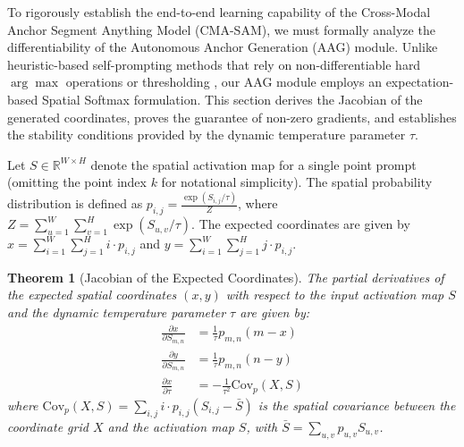 \documentclass[onecolumn]{IEEEtran}
\numberwithin{equation}{section}
\newtheorem{theorem}{Theorem}[section]
\theoremstyle{definition}
\theoremstyle{remark}
\begin{document}
To rigorously establish the end-to-end learning capability of the Cross-Modal Anchor Segment Anything Model (CMA-SAM), we must formally analyze the differentiability of the Autonomous Anchor Generation (AAG) module. Unlike heuristic-based self-prompting methods that rely on non-differentiable hard \(\arg\max\) operations or thresholding \cite{xie2025self, chen2024un}, our AAG module employs an expectation-based Spatial Softmax formulation. This section derives the Jacobian of the generated coordinates, proves the guarantee of non-zero gradients, and establishes the stability conditions provided by the dynamic temperature parameter \(\tau\).

Let \(S \in \mathbb{R}^{W \times H}\) denote the spatial activation map for a single point prompt (omitting the point index \(k\) for notational simplicity). The spatial probability distribution is defined as \(p_{i,j} = \frac{\exp(S_{i,j}/\tau)}{Z}\), where \(Z = \sum_{u=1}^W \sum_{v=1}^H \exp(S_{u,v}/\tau)\). The expected coordinates are given by \(x = \sum_{i=1}^W \sum_{j=1}^H i \cdot p_{i,j}\) and \(y = \sum_{i=1}^W \sum_{j=1}^H j \cdot p_{i,j}\).

\begin{theorem}[Jacobian of the Expected Coordinates]
\label{thm:jacobian_spatial_softmax}
The partial derivatives of the expected spatial coordinates \((x, y)\) with respect to the input activation map \(S\) and the dynamic temperature parameter \(\tau\) are given by:
\begin{align}
    \frac{\partial x}{\partial S_{m,n}} &= \frac{1}{\tau} p_{m,n} (m - x) \label{eq:grad_x_S} \\
    \frac{\partial y}{\partial S_{m,n}} &= \frac{1}{\tau} p_{m,n} (n - y) \label{eq:grad_y_S} \\
    \frac{\partial x}{\partial \tau} &= -\frac{1}{\tau^2} \mathrm{Cov}_{p}(X, S) \label{eq:grad_x_tau}
\end{align}
where \(\mathrm{Cov}_{p}(X, S) = \sum_{i,j} i \cdot p_{i,j} (S_{i,j} - \bar{S})\) is the spatial covariance between the coordinate grid \(X\) and the activation map \(S\), with \(\bar{S} = \sum_{u,v} p_{u,v} S_{u,v}\).
\end{theorem}
\end{document}
